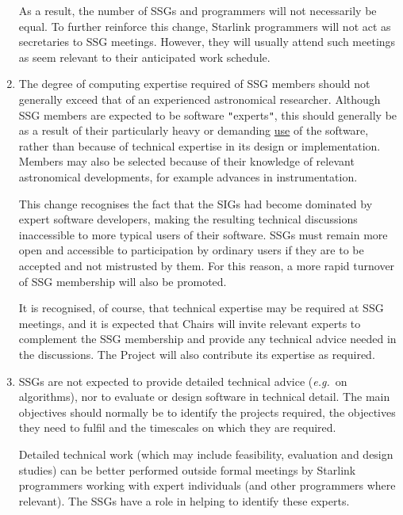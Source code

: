\documentclass[11pt]{article}
\newcommand{\st}[1]{{\em{#1}}}
\newcommand{\qt}[1]{``#1''}
\renewcommand{\qt}[1]{{\tt{"}}#1{\tt{"}}}
\begin{document}
\begin{enumerate}
As a result, the number of SSGs and programmers will not necessarily
be equal. To further reinforce this change, Starlink programmers will
not act as secretaries to SSG meetings. However, they will usually
attend such meetings as seem relevant to their anticipated work
schedule.

\item The degree of computing expertise required of SSG members should
not generally exceed that of an experienced astronomical
researcher. Although SSG members are expected to be software
\qt{experts}, this should generally be as a result of their
particularly heavy or demanding \underline{use} of the software,
rather than because of technical expertise in its design or
implementation. Members may also be selected because of their
knowledge of relevant astronomical developments, for example advances
in instrumentation.

This change recognises the fact that the SIGs had become dominated by
expert software developers, making the resulting technical discussions
inaccessible to more typical users of their software. SSGs must remain
more open and accessible to participation by ordinary users if they
are to be accepted and not mistrusted by them. For this reason, a more
rapid turnover of SSG membership will also be promoted.

It is recognised, of course, that technical expertise may be required
at SSG meetings, and it is expected that Chairs will invite relevant
experts to complement the SSG membership and provide any technical
advice needed in the discussions. The Project will also contribute its
expertise as required.

\item SSGs are not expected to provide detailed technical advice
(\st{e.g.}\ on algorithms), nor to evaluate or design software in
technical detail. The main objectives should normally be to identify
the projects required, the objectives they need to fulfil and the
timescales on which they are required.

Detailed technical work (which may include feasibility, evaluation and
design studies) can be better performed outside formal meetings by
Starlink programmers working with expert individuals (and other
programmers where relevant). The SSGs have a role in helping to
identify these experts.

\end{enumerate}
\end{document}
